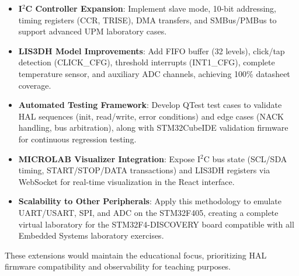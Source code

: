 \begin{itemize}
  \item \textbf{I$^2$C Controller Expansion}: Implement slave mode, 10-bit 
  addressing, timing registers (CCR, TRISE), DMA transfers, and SMBus/PMBus to 
  support advanced UPM laboratory cases.
  
  \item \textbf{LIS3DH Model Improvements}: Add FIFO buffer (32 levels), click/tap 
  detection (CLICK\_CFG), threshold interrupts (INT1\_CFG), complete temperature 
  sensor, and auxiliary ADC channels, achieving 100\% datasheet coverage.
  
  \item \textbf{Automated Testing Framework}: Develop QTest test cases to validate 
  HAL sequences (init, read/write, error conditions) and edge cases (NACK handling, 
  bus arbitration), along with STM32CubeIDE validation firmware for continuous 
  regression testing.
  
  \item \textbf{MICROLAB Visualizer Integration}: Expose I$^2$C bus state (SCL/SDA 
  timing, START/STOP/DATA transactions) and LIS3DH registers via WebSocket for 
  real-time visualization in the React interface.
  
  \item \textbf{Scalability to Other Peripherals}: Apply this methodology to emulate 
  UART/USART, SPI, and ADC on the STM32F405, creating a complete virtual laboratory 
  for the STM32F4-DISCOVERY board compatible with all Embedded Systems laboratory 
  exercises.
\end{itemize}

These extensions would maintain the educational focus, prioritizing HAL firmware 
compatibility and observability for teaching purposes.

